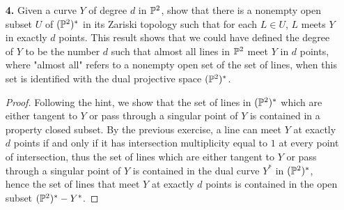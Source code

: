 \documentclass{article}
\begin{document}
\begin{enumerate} [label=\textbf{\arabic*.}, leftmargin=0cm]
\item[\textbf{4.}] Given a curve $Y$ of degree $d$ in $\mathbb{P}^2$, show that there is a nonempty open subset $U$ of $(\mathbb{P}^2)^*$ in its Zariski topology such that for each $L \in U$, $L$ meets $Y$ in exactly $d$ points. This result shows that we could have defined the degree of $Y$ to be the number $d$ such that almost all lines in $\mathbb{P}^2$ meet $Y$ in $d$ points, where "almost all" refers to a nonempty open set of the set of lines, when this set is identified with the dual projective space $(\mathbb{P}^2)^*$.

\begin{proof}
  Following the hint, we show that the set of lines in $(\mathbb{P}^2)^*$ which are either tangent to $Y$ or pass through a singular point of $Y$ is contained in a property closed subset. By the previous exercise, a line can meet $Y$ at exactly $d$ points if and only if it has intersection multiplicity equal to $1$ at every point of intersection, thus the set of lines which are either tangent to $Y$ or pass through a singular point of $Y$ is contained in the dual curve $Y^*$ in $(\mathbb{P}^2)^*$, hence the set of lines that meet $Y$ at exactly $d$ points is contained in the open subset $(\mathbb{P}^2)^* - Y^*$.  
\end{proof}

\end{enumerate}
\end{document}
